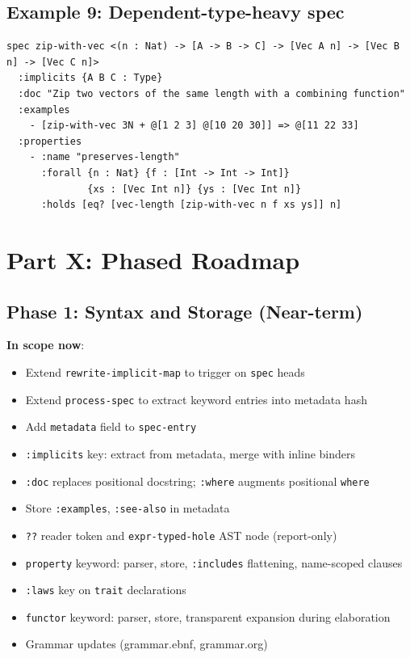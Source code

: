 \documentclass[11pt]{article}
\begin{document}
\subsection{Example 9: Dependent-type-heavy spec}
\label{sec:org0fe95e4}

\begin{verbatim}
spec zip-with-vec <(n : Nat) -> [A -> B -> C] -> [Vec A n] -> [Vec B n] -> [Vec C n]>
  :implicits {A B C : Type}
  :doc "Zip two vectors of the same length with a combining function"
  :examples
    - [zip-with-vec 3N + @[1 2 3] @[10 20 30]] => @[11 22 33]
  :properties
    - :name "preserves-length"
      :forall {n : Nat} {f : [Int -> Int -> Int]}
              {xs : [Vec Int n]} {ys : [Vec Int n]}
      :holds [eq? [vec-length [zip-with-vec n f xs ys]] n]
\end{verbatim}
\section{Part X: Phased Roadmap}
\label{sec:org69b00ad}

\subsection{Phase 1: Syntax and Storage (Near-term)}
\label{sec:org173d39b}

\textbf{In scope now}:
\begin{itemize}
\item Extend \texttt{rewrite-implicit-map} to trigger on \texttt{spec} heads
\item Extend \texttt{process-spec} to extract keyword entries into metadata hash
\item Add \texttt{metadata} field to \texttt{spec-entry}
\item \texttt{:implicits} key: extract from metadata, merge with inline binders
\item \texttt{:doc} replaces positional docstring; \texttt{:where} augments positional \texttt{where}
\item Store \texttt{:examples}, \texttt{:see-also} in metadata
\item \texttt{??} reader token and \texttt{expr-typed-hole} AST node (report-only)
\item \texttt{property} keyword: parser, store, \texttt{:includes} flattening, name-scoped clauses
\item \texttt{:laws} key on \texttt{trait} declarations
\item \texttt{functor} keyword: parser, store, transparent expansion during elaboration
\item Grammar updates (grammar.ebnf, grammar.org)
\end{itemize}
\end{document}
